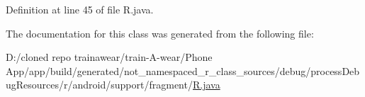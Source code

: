 Definition at line 45 of file R.\+java.



The documentation for this class was generated from the following file\+:\begin{DoxyCompactItemize}
\item 
D\+:/cloned repo trainawear/train-\/\+A-\/wear/\+Phone App/app/build/generated/not\+\_\+namespaced\+\_\+r\+\_\+class\+\_\+sources/debug/process\+Debug\+Resources/r/android/support/fragment/\mbox{\hyperlink{process_debug_resources_2r_2android_2support_2fragment_2_r_8java}{R.\+java}}\end{DoxyCompactItemize}
